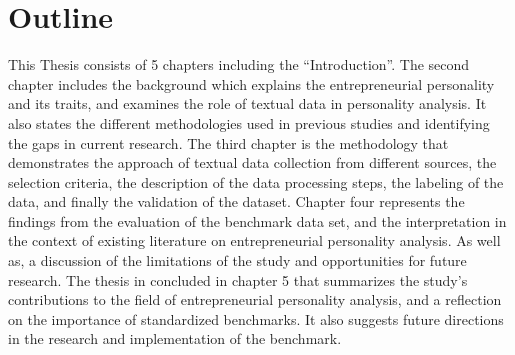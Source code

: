 \section{Outline}
This Thesis consists of 5 chapters including the “Introduction”. The second chapter includes the background which explains the entrepreneurial personality and its traits, and examines the role of textual data in personality analysis. It also states the different methodologies used in previous studies and identifying the gaps in current research. The third chapter is the methodology that demonstrates the approach of textual data collection from different sources, the selection criteria, the description of the data processing steps, the labeling of the data, and finally the validation of the dataset. Chapter four represents the findings from the evaluation of the benchmark data set, and the interpretation in the context of existing literature on entrepreneurial personality analysis. As well as, a discussion of the limitations of the study and opportunities for future research. The thesis in concluded in chapter 5 that summarizes the study's contributions to the field of entrepreneurial personality analysis, and a reflection on the importance of standardized benchmarks. It also suggests future directions in the research and implementation of the benchmark.


%
